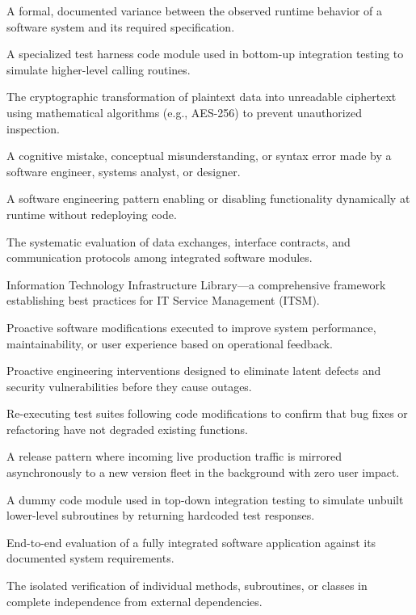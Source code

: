 \documentclass[11pt,a4paper]{article}
\begin{document}
\begin{description}[leftmargin=!,labelwidth=4.5cm]
    \item[Defect] A formal, documented variance between the observed runtime behavior of a software system and its required specification.
    \item[Driver] A specialized test harness code module used in bottom-up integration testing to simulate higher-level calling routines.
    \item[Encryption] The cryptographic transformation of plaintext data into unreadable ciphertext using mathematical algorithms (e.g., AES-256) to prevent unauthorized inspection.
    \item[Error] A cognitive mistake, conceptual misunderstanding, or syntax error made by a software engineer, systems analyst, or designer.
    \item[Feature Toggle] A software engineering pattern enabling or disabling functionality dynamically at runtime without redeploying code.
    \item[Integration Testing] The systematic evaluation of data exchanges, interface contracts, and communication protocols among integrated software modules.
    \item[ITIL] Information Technology Infrastructure Library---a comprehensive framework establishing best practices for IT Service Management (ITSM).
    \item[Perfective Maintenance] Proactive software modifications executed to improve system performance, maintainability, or user experience based on operational feedback.
    \item[Preventive Maintenance] Proactive engineering interventions designed to eliminate latent defects and security vulnerabilities before they cause outages.
    \item[Regression Testing] Re-executing test suites following code modifications to confirm that bug fixes or refactoring have not degraded existing functions.
    \item[Shadow Deployment] A release pattern where incoming live production traffic is mirrored asynchronously to a new version fleet in the background with zero user impact.
    \item[Stub] A dummy code module used in top-down integration testing to simulate unbuilt lower-level subroutines by returning hardcoded test responses.
    \item[System Testing] End-to-end evaluation of a fully integrated software application against its documented system requirements.
    \item[Unit Testing] The isolated verification of individual methods, subroutines, or classes in complete independence from external dependencies.
\end{description}
\end{document}
